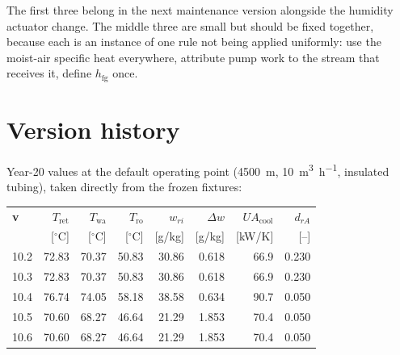 \documentclass[11pt]{article}
\newcommand{\UA}{\ensuremath{U\!A}}
\newcommand{\hfg}{\ensuremath{h_{\mathrm{fg}}}}
\newcommand{\degC}{\ensuremath{^{\circ}\mathrm{C}}}
\begin{document}
The first three belong in the next maintenance version alongside the humidity
actuator change. The middle three are small but should be fixed together,
because each is an instance of one rule not being applied uniformly: use the
moist-air specific heat everywhere, attribute pump work to the stream that
receives it, define $\hfg$ once.

\section{Version history}\label{sec:history}

Year-20 values at the default operating point
(\SI{4500}{\metre}, \SI{10}{\cubic\metre\per\hour}, insulated
tubing), taken directly from the frozen fixtures:

\begin{longtable}{@{}lrrrrrrr@{}}
\toprule
\textbf{v} & $T_{\mathrm{ret}}$ & $T_{\mathrm{wa}}$ & $T_{\mathrm{ro}}$ &
$w_{ri}$ & $\Delta w$ & $\UA_{\mathrm{cool}}$ & $d_{rA}$ \\
 & [\degC] & [\degC] & [\degC] & [g/kg] & [g/kg] & [kW/K] & [--] \\
\midrule
\endhead
10.2 & 72.83 & 70.37 & 50.83 & 30.86 & 0.618 & 66.9 & 0.230 \\
10.3 & 72.83 & 70.37 & 50.83 & 30.86 & 0.618 & 66.9 & 0.230 \\
10.4 & 76.74 & 74.05 & 58.18 & 38.58 & 0.634 & 90.7 & 0.050 \\
10.5 & 70.60 & 68.27 & 46.64 & 21.29 & 1.853 & 70.4 & 0.050 \\
10.6 & 70.60 & 68.27 & 46.64 & 21.29 & 1.853 & 70.4 & 0.050 \\

\bottomrule
\end{longtable}
\end{document}
